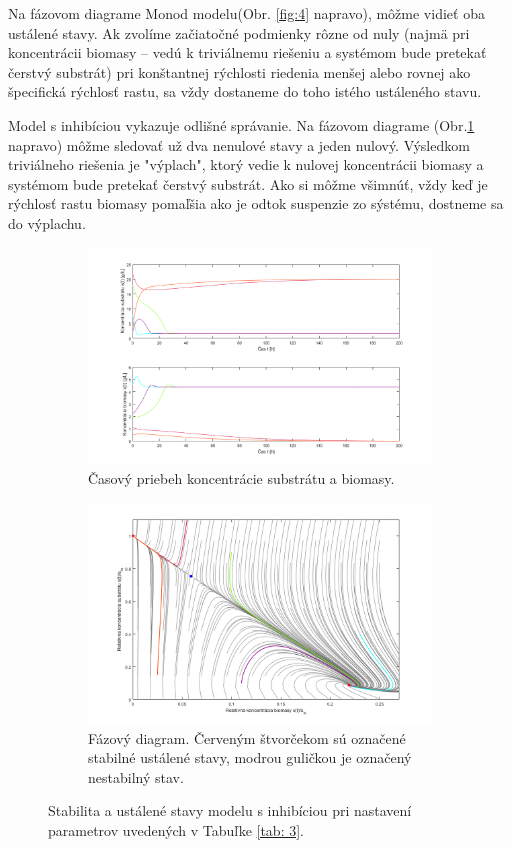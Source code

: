 Na  fázovom diagrame Monod modelu(Obr. \ref{fig:4} napravo), môžme vidieť oba ustálené stavy. Ak zvolíme začiatočné podmienky rôzne od nuly (najmä pri koncentrácii biomasy -- vedú k triviálnemu riešeniu a systémom bude pretekať čerstvý substrát) pri konštantnej rýchlosti riedenia menšej alebo rovnej ako špecifická rýchlosť rastu, sa vždy dostaneme do toho istého ustáleného stavu.

Model s inhibíciou vykazuje odlišné správanie. Na fázovom diagrame (Obr.\ref{fig:5} napravo) môžme sledovať už dva nenulové stavy a jeden nulový. Výsledkom triviálneho riešenia je "výplach", ktorý vedie k nulovej koncentrácii biomasy a systémom bude pretekať čerstvý substrát. Ako si môžme všimnúť, vždy keď je rýchlosť rastu biomasy pomaľšia ako je odtok suspenzie zo sýstému, dostneme sa do výplachu.

\begin{figure}
	\begin{subfigure}{.5\textwidth}
		\centering
		\includegraphics[width=1\linewidth]{images/init_cond_inhb}
		\caption[]{Časový priebeh koncentrácie substrátu a biomasy.}
	\end{subfigure}
	\begin{subfigure}{.5\textwidth}
		\centering
		\includegraphics[width=1\linewidth]{images/phase_inhb}
		\caption[]{Fázový diagram. Červeným štvorčekom sú označené stabilné ustálené stavy, modrou guličkou je označený nestabilný stav.}
	\end{subfigure}
	\caption{Stabilita a ustálené stavy modelu s inhibíciou pri nastavení parametrov uvedených v Tabuľke \ref{tab: 3}.}
	\label{fig:5}
\end{figure}

